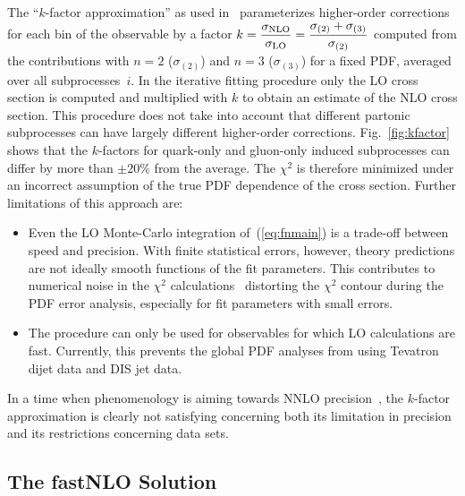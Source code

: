 The ``$k$-factor approximation''
as used in~\cite{Martin:2004ir,Pumplin:2002vw}
parameterizes higher-order corrections
for each bin of the observable by a factor
$\displaystyle k = \frac{\sigma_{\rm NLO}}{\sigma_{\rm LO}}
= \frac{\sigma_{(2)}+\sigma_{(3)}}{\sigma_{(2)}}$
computed from the contributions 
with $n=2$ ($\sigma_{(2)}$) and $n=3$ ($\sigma_{(3)}$)
for a fixed PDF, averaged over all subprocesses~$i$.
In the iterative fitting procedure
only the LO cross section is computed
and multiplied with $k$ to obtain an estimate of 
the NLO cross section.
This procedure does not take into account that 
different partonic subprocesses can have largely 
different higher-order corrections.
Fig.~\ref{fig:kfactor} shows that the $k$-factors
for quark-only and gluon-only induced subprocesses
can differ by more than $\pm20\%$ from the average.
%
The $\chi^2$ is therefore minimized under an incorrect assumption
of the true PDF dependence of the cross section.
%
Further limitations of this approach are:
\begin{itemize}
\item 
   Even the LO Monte-Carlo integration of~(\ref{eq:fnmain})
   is a trade-off between speed  
   and precision. With finite statistical errors,
   however, theory predictions are not ideally smooth 
   functions of the fit parameters.
   This contributes to numerical noise in the $\chi^2$
   calculations~\cite{Pumplin:2000vx}
   distorting the  $\chi^2$ contour during the  
   PDF error analysis, especially for fit parameters 
   with small errors.

\item
   The procedure can only be used for observables for 
   which LO calculations  are fast. 
   Currently, this prevents the global PDF analyses from  
   using Tevatron dijet data and DIS jet data. 
\end{itemize}
%
In a time when phenomenology is aiming towards 
NNLO precision~\cite{Alekhin:2005gq,Martin:2004ir},
the $k$-factor approximation is clearly not satisfying concerning both
its limitation  in precision and its restrictions concerning data sets.






\subsection{The fastNLO Solution}




